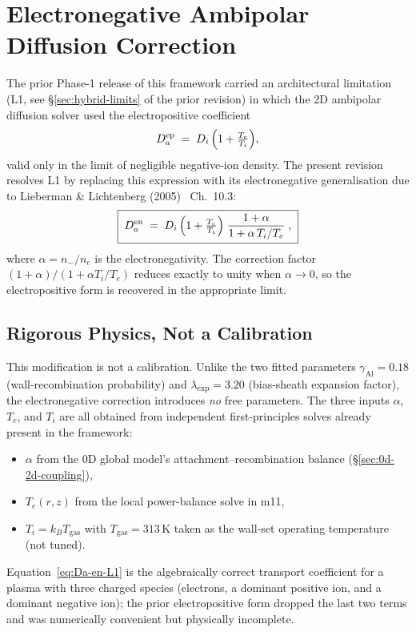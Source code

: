 \section{Electronegative Ambipolar Diffusion Correction}
\label{sec:electronegative-ambipolar}

The prior Phase-1 release of this framework carried an architectural
limitation (L1, see \S\ref{sec:hybrid-limits} of the prior revision) in
which the 2D ambipolar diffusion solver used the electropositive
coefficient
\[
  D_a^\mathrm{ep} \;=\; D_i\,\Bigl(1 + \tfrac{T_e}{T_i}\Bigr),
\]
valid only in the limit of negligible negative-ion density.  The present
revision resolves L1 by replacing this expression with its
electronegative generalisation due to Lieberman \& Lichtenberg
(2005)~\cite{Lieberman2005} Ch.~10.3:
\begin{equation}
  \boxed{\;D_a^\mathrm{en} \;=\; D_i\,\Bigl(1 + \tfrac{T_e}{T_i}\Bigr)
  \;\frac{1 + \alpha}{1 + \alpha\,T_i/T_e}\;,\;}
  \label{eq:Da-en-L1}
\end{equation}
where $\alpha = n_{-}/n_e$ is the electronegativity.  The correction
factor $(1+\alpha)/(1+\alpha T_i/T_e)$ reduces exactly to unity when
$\alpha \to 0$, so the electropositive form is recovered in the appropriate
limit.

\subsection{Rigorous Physics, Not a Calibration}

This modification is not a calibration.  Unlike the two fitted parameters
$\gamma_\mathrm{Al} = 0.18$ (wall-recombination probability) and
$\lambda_\mathrm{exp} = 3.20$ (bias-sheath expansion factor), the
electronegative correction introduces \emph{no} free parameters.  The
three inputs $\alpha$, $T_e$, and $T_i$ are all obtained from independent
first-principles solves already present in the framework:
\begin{itemize}
  \item $\alpha$ from the 0D global model's attachment--recombination
  balance (\S\ref{sec:0d-2d-coupling}),
  \item $T_e(r,z)$ from the local power-balance solve in m11,
  \item $T_i = k_B T_\mathrm{gas}$ with $T_\mathrm{gas} = 313$\,K taken
  as the wall-set operating temperature (not tuned).
\end{itemize}
Equation~\ref{eq:Da-en-L1} is the algebraically correct transport
coefficient for a plasma with three charged species (electrons, a
dominant positive ion, and a dominant negative ion); the prior
electropositive form dropped the last two terms and was numerically
convenient but physically incomplete.

